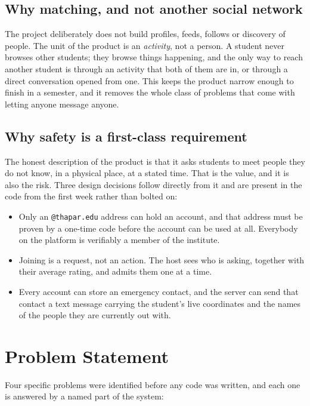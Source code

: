 \documentclass{tietreport}
\begin{document}
\subsection{Why matching, and not another social network}

The project deliberately does not build profiles, feeds, follows or discovery of
people. The unit of the product is an \emph{activity}, not a person. A student
never browses other students; they browse things happening, and the only way to
reach another student is through an activity that both of them are in, or through
a direct conversation opened from one. This keeps the product narrow enough to
finish in a semester, and it removes the whole class of problems that come with
letting anyone message anyone.

\subsection{Why safety is a first-class requirement}

The honest description of the product is that it asks students to meet people they
do not know, in a physical place, at a stated time. That is the value, and it is
also the risk. Three design decisions follow directly from it and are present in
the code from the first week rather than bolted on:

\begin{itemize}[nosep]
  \item Only an \texttt{@thapar.edu} address can hold an account, and that address
        must be proven by a one-time code before the account can be used at all.
        Everybody on the platform is verifiably a member of the institute.
  \item Joining is a request, not an action. The host sees who is asking, together
        with their average rating, and admits them one at a time.
  \item Every account can store an emergency contact, and the server can send that
        contact a text message carrying the student's live coordinates and the names
        of the people they are currently out with.
\end{itemize}

\section{Problem Statement}

Four specific problems were identified before any code was written, and each one is
answered by a named part of the system:
\end{document}
